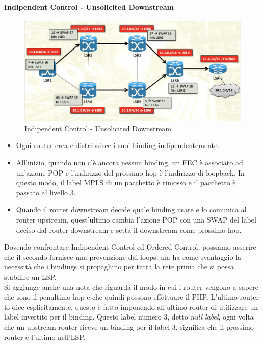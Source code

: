 \documentclass{article}
\begin{document}
\paragraph{Indipendent Control - Unsolicited Downstream}
\begin{figure}[H]
    \centering
    \includegraphics[scale=0.3]{figures/indipendent control.png}
    \caption{Indipendent Control - Unsolicited Downstream}
\end{figure}
\begin{itemize}
    \item Ogni router crea e distribuisce i suoi binding indipendentemente.
    \item All'inizio, quando non c'è ancora nessun binding, un FEC è associato ad un'azione POP e l'indirizzo del prossimo hop è l'indirizzo di loopback. In questo modo, il label MPLS di un pacchetto è rimosso e il pacchetto è passato al livello 3.
    \item Quando il router downstream decide quale binding usare e lo comunica al router upstream, quest'ultimo cambia l'azione POP con una SWAP del label deciso dal router downstream e setta il downstream come prossimo hop.
\end{itemize}
Dovendo confrontare Indipendent Control ed Ordered Control, possiamo asserire che il secondo fornisce una prevenzione dai loops, ma ha come svantaggio la necessità che i bindings si propaghino per tutta la rete prima che si possa stabilire un LSP. 
\\
Si aggiunge anche una nota che riguarda il modo in cui i router vengono a sapere che sono il penultimo hop e che quindi possono effettuare il PHP. L'ultimo router lo dice esplicitamente, questo è fatto imponendo all'ultimo router di utilizzare un label invertito per il binding. Questo label numero 3, detto \textit{null label}, ogni volta che un upstream router riceve un binding per il label 3, significa che il prossimo router è l'ultimo nell'LSP. 
\end{document}
